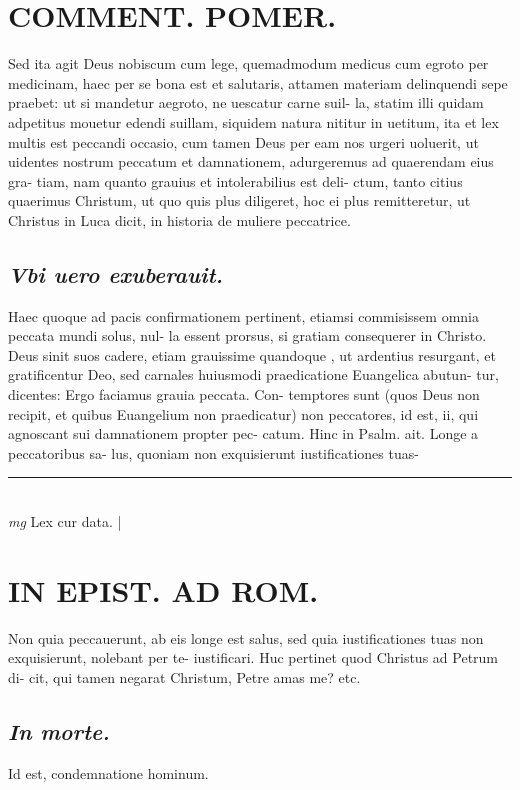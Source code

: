 \documentclass{article}
\begin{document}
\begin{pages}
\section*{COMMENT. POMER.  }\pstart Sed ita agit Deus nobiscum cum lege, quemadmodum medicus cum egroto per medicinam, haec per se bona est et salutaris, attamen materiam delinquendi sepe praebet: ut si mandetur aegroto, ne uescatur carne suil- la, statim illi quidam adpetitus mouetur edendi suillam, siquidem natura nititur in uetitum, ita et lex multis est peccandi occasio, cum tamen Deus per eam nos urgeri uoluerit, ut uidentes nostrum peccatum et damnationem, adurgeremus ad quaerendam eius gra- tiam, nam quanto grauius et intolerabilius est deli- ctum, tanto citius quaerimus Christum, ut quo quis plus diligeret, hoc ei plus remitteretur, ut Christus in Luca dicit, in historia de muliere peccatrice.   \pend
{}
{}
\subsection*{\textit{Vbi uero exuberauit. }}\pstart Haec quoque ad pacis confirmationem pertinent, etiamsi commisissem omnia peccata mundi solus, nul- la essent prorsus, si gratiam consequerer in Christo.  Deus sinit suos cadere, etiam grauissime quandoque , ut ardentius resurgant, et gratificentur Deo, sed carnales huiusmodi praedicatione Euangelica abutun- tur, dicentes: Ergo faciamus grauia peccata. Con- temptores sunt (quos Deus non recipit, et quibus Euangelium non praedicatur) non peccatores, id est, ii, qui agnoscant sui damnationem propter pec- catum. Hinc in Psalm. ait. Longe a peccatoribus sa- lus, quoniam non exquisierunt iustificationes tuas-  \pend
\vspace{0.5cm}\noindent
\vspace{0.2cm}\rule{1cm}{0.2pt}\\ 
\hspace{0.2cm}\textit{mg}
\footnotesize Lex cur data.  
\normalsize| 
\section*{IN EPIST. AD ROM.  }
\marginpar{[ p.57 ]}\pstart Non quia peccauerunt, ab eis longe est salus, sed quia iustificationes tuas non exquisierunt, nolebant per te- iustificari. Huc pertinet quod Christus ad Petrum di- cit, qui tamen negarat Christum, Petre amas me? etc.   \pend
{}
{}
\subsection*{\textit{In morte. }}\pstart Id est, condemnatione hominum.   \pend
{}
{}

\end{pages}
\end{document}
